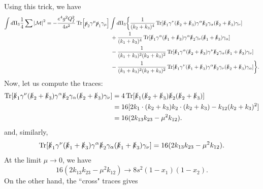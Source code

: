 \documentclass[11pt]{article}
\theoremstyle{definition}
\begin{document}
Using this trick, we have
\begin{equation}
    \begin{aligned}
        \int d\Pi_3 \frac{1}{4}\sum \abs{\mathcal{M}}^2 &= -\frac{e^4g^2Q_f^2}{4s^2}\Tr[\slashed{p}_2\gamma^\mu\slashed{p}_1\gamma_\mu]\int d\Pi_3\bigg\{  \frac{1}{(k_2+k_3)^4}\Tr[\slashed{k}_1\gamma^\nu(\slashed{k}_2 + \slashed{k}_3)\gamma^\alpha\slashed{k}_2\gamma_\alpha(\slashed{k}_2 + \slashed{k}_3)\gamma_\nu]\\
        &\qquad \qquad \qquad \qquad \qquad \qquad+ \frac{1}{(k_1+k_3)^4}\Tr[\slashed{k}_1\gamma^\alpha(\slashed{k}_1 + \slashed{k}_3)\gamma^\alpha\slashed{k}_2\gamma_\nu(\slashed{k}_1 + \slashed{k}_3)\gamma_\alpha]\\
        &\qquad \qquad \qquad \qquad \qquad \qquad- \frac{1}{(k_1+k_3)^2(k_2+k_3)^2}\Tr[\slashed{k}_1\gamma^\alpha(\slashed{k}_2 + \slashed{k}_3)\gamma^\nu\slashed{k}_2\gamma_\alpha(\slashed{k}_1 + \slashed{k}_3)\gamma_\nu]\\
        &\qquad \qquad \qquad \qquad \qquad \qquad - \frac{1}{(k_1+k_3)^2(k_2+k_3)^2}\Tr[\slashed{k}_1\gamma^\nu(\slashed{k}_1 + \slashed{k}_3)\gamma^\alpha\slashed{k}_2\gamma_\nu(\slashed{k}_2 + \slashed{k}_3)\gamma_\alpha]\bigg\}.
    \end{aligned}
\end{equation}
Now, let us compute the traces:
\begin{equation}
    \begin{aligned}
        \Tr[\slashed{k}_1\gamma^\nu(\slashed{k}_2 + \slashed{k}_3)\gamma^\alpha\slashed{k}_2\gamma_\alpha(\slashed{k}_2 + \slashed{k}_3)\gamma_\nu] &= 4\Tr[\slashed{k}_1(\slashed{k}_2 + \slashed{k}_3)\slashed{k}_2(\slashed{k}_2 + \slashed{k}_3)]\\
        &= 16[2k_1\cdot(k_2+k_3)k_2\cdot(k_2+k_3)-k_{12}(k_2+k_3)^2]\\
        &= 16(2k_{13}k_{23}-\mu^2k_{12}).
    \end{aligned}
\end{equation}
and, similarly,
\begin{equation}
     \Tr[\slashed{k}_1\gamma^\nu(\slashed{k}_1 + \slashed{k}_3)\gamma^\alpha\slashed{k}_2\gamma_\alpha(\slashed{k}_1 + \slashed{k}_3)\gamma_\nu] =16(2k_{13}k_{23}-\mu^2k_{12}).
\end{equation}
At the limit $\mu\to 0$, we have
\begin{equation}
    16(2k_{13}k_{23}-\mu^2k_{12}) \to 8s^2(1-x_1)(1-x_2).
\end{equation}
On the other hand, the ``cross" traces gives
\end{document}
